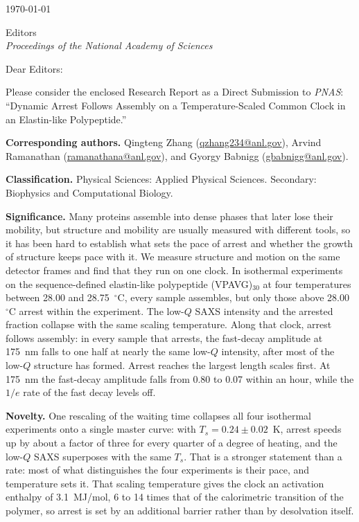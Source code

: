\documentclass[10pt]{article}
\begin{document}
\today

Editors\\
\textit{Proceedings of the National Academy of Sciences}

Dear Editors:

Please consider the enclosed Research Report as a Direct Submission to
\textit{PNAS}: ``Dynamic Arrest Follows Assembly on a Temperature-Scaled
Common Clock in an Elastin-like Polypeptide.''

\textbf{Corresponding authors.} Qingteng Zhang
\mbox{(\href{mailto:qzhang234@anl.gov}{qzhang234@anl.gov})}, Arvind Ramanathan
\mbox{(\href{mailto:ramanathana@anl.gov}{ramanathana@anl.gov})}, and Gyorgy Babnigg
\mbox{(\href{mailto:gbabnigg@anl.gov}{gbabnigg@anl.gov})}.

\textbf{Classification.} Physical Sciences: Applied Physical Sciences.
Secondary: Biophysics and Computational Biology.

\textbf{Significance.} Many proteins assemble into dense phases that later
lose their mobility, but structure and mobility are usually measured with
different tools, so it has been hard to establish what sets the pace of arrest
and whether the growth of structure keeps pace with it.
We measure structure and motion on the same detector frames and find that they
run on one clock. In isothermal
experiments on the sequence-defined elastin-like polypeptide (VPAVG)$_{30}$ at
four temperatures between 28.00 and 28.75~$^\circ$C, every sample assembles,
but only those above 28.00~$^\circ$C arrest within the experiment. The
low-$Q$ SAXS intensity and the arrested fraction collapse with the same
scaling temperature. Along that clock, arrest follows assembly: in every sample
that arrests, the fast-decay amplitude at 175~nm falls to one half at nearly
the same low-$Q$ intensity, after most of the low-$Q$ structure has formed. Arrest reaches
the largest length scales first. At 175~nm the fast-decay amplitude falls from
0.80 to 0.07 within an hour, while the $1/e$ rate of the fast decay levels off.

\textbf{Novelty.} One rescaling of the waiting time collapses all four
isothermal experiments onto a single master curve: with $T_s=0.24\pm0.02$~K,
arrest speeds up by about a factor of three for every quarter of a degree of
heating, and the low-$Q$ SAXS superposes with the same $T_s$. That is a stronger statement than a rate: most of what
distinguishes the four experiments is their pace, and temperature sets it. That scaling temperature gives the clock an
activation enthalpy of 3.1~MJ/mol, 6 to 14 times that of the calorimetric
transition of the polymer, so arrest is set by an additional barrier rather than
by desolvation itself.
\end{document}
